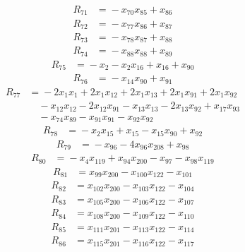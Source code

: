 \begin{align*}
R_{71}&={}-x_{70}x_{85} +x_{86}
\end{align*}
\begin{align*}
R_{72}&={}-x_{77}x_{86} +x_{87}
\end{align*}
\begin{align*}
R_{73}&={}-x_{78}x_{87} +x_{88}
\end{align*}
\begin{align*}
R_{74}&={}-x_{88}x_{88} +x_{89}
\end{align*}
\begin{align*}
R_{75}&={}-x_{2} -x_{2}x_{16} +x_{16} +x_{90}
\end{align*}
\begin{align*}
R_{76}&={}-x_{14}x_{90} +x_{91}
\end{align*}
\begin{align*}
R_{77}&={}-2x_{1}x_{1} +2x_{1}x_{12} +2x_{1}x_{13} +2x_{1}x_{91} +2x_{1}x_{92}\\
&\quad{}-x_{12}x_{12} -2x_{12}x_{91} -x_{13}x_{13} -2x_{13}x_{92} +x_{17}x_{93}\\
&\quad{}-x_{74}x_{89} -x_{91}x_{91} -x_{92}x_{92}
\end{align*}
\begin{align*}
R_{78}&={}-x_{2}x_{15} +x_{15} -x_{15}x_{90} +x_{92}
\end{align*}
\begin{align*}
R_{79}&={}-x_{96} -4x_{96}x_{208} +x_{98}
\end{align*}
\begin{align*}
R_{80}&={}-x_{4}x_{119} +x_{94}x_{200} -x_{97} -x_{98}x_{119}
\end{align*}
\begin{align*}
R_{81}&={}x_{99}x_{200} -x_{100}x_{122} -x_{101}
\end{align*}
\begin{align*}
R_{82}&={}x_{102}x_{200} -x_{103}x_{122} -x_{104}
\end{align*}
\begin{align*}
R_{83}&={}x_{105}x_{200} -x_{106}x_{122} -x_{107}
\end{align*}
\begin{align*}
R_{84}&={}x_{108}x_{200} -x_{109}x_{122} -x_{110}
\end{align*}
\begin{align*}
R_{85}&={}x_{111}x_{201} -x_{113}x_{122} -x_{114}
\end{align*}
\begin{align*}
R_{86}&={}x_{115}x_{201} -x_{116}x_{122} -x_{117}
\end{align*}
